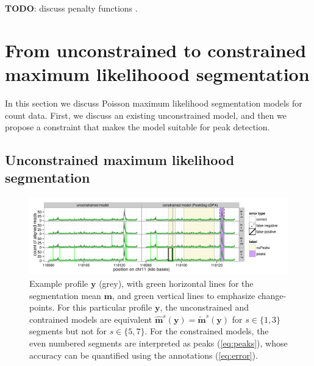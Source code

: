 \documentclass{article}
\begin{document}
\textbf{TODO}: discuss penalty functions \citep{cleynen2013segmentation}.

\section{From unconstrained to constrained maximum likelihoood
  segmentation}

In this section we discuss Poisson maximum likelihood segmentation
models for count data. First, we discuss an existing unconstrained
model, and then we propose a constraint that makes the model suitable
for peak detection.

\subsection{Unconstrained maximum likelihood segmentation}

\begin{figure}[b!]
  \centering
  \includegraphics[width=\textwidth]{figure-Segmentor-PeakSeg}
  \vskip -0.5cm
  \caption{Example profile $\mathbf y$ (grey), with green horizontal
    lines for the segmentation mean $\mathbf m$, and green vertical
    lines to emphasize change-points. For this particular profile
    $\mathbf y$, the unconstrained and contrained models are
    equivalent $\mathbf{\hat m}^s(\mathbf y) = \mathbf{\tilde
      m}^s(\mathbf y)$ for $s\in\{1, 3\}$ segments but not for
    $s\in\{5, 7\}$. For the constrained models, the even numbered
    segments are interpreted as peaks (\ref{eq:peaks}), whose accuracy
    can be quantified using the annotations (\ref{eq:error}).}
  \label{fig:profiles}
\end{figure}
\end{document}
